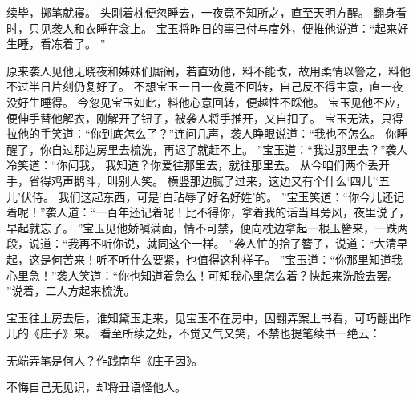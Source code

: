 续毕，掷笔就寝。
头刚着枕便忽睡去，一夜竟不知所之，直至天明方醒。
翻身看时，只见袭人和衣睡在衾上。
宝玉将昨日的事已付与度外，便推他说道：“起来好生睡，看冻着了。
”\par
原来袭人见他无晓夜和姊妹们厮闹，若直劝他，料不能改，故用柔情以警之，料他不过半日片刻仍复好了。
不想宝玉一日一夜竟不回转，自己反不得主意，直一夜没好生睡得。
今忽见宝玉如此，料他心意回转，便越性不睬他。
宝玉见他不应，便伸手替他解衣，刚解开了钮子，被袭人将手推开，又自扣了。
宝玉无法，只得拉他的手笑道：“你到底怎么了？”连问几声，袭人睁眼说道：“我也不怎么。
你睡醒了，你自过那边房里去梳洗，再迟了就赶不上。
”宝玉道：“我过那里去？”袭人冷笑道：“你问我，
我知道？你爱往那里去，就往那里去。
从今咱们两个丢开手，省得鸡声鹅斗，叫别人笑。
横竖那边腻了过来，这边又有个什么‘四儿’‘五儿’伏侍。
我们这起东西，可是‘白玷辱了好名好姓’的。
”宝玉笑道：“你今儿还记着呢！”袭人道：“一百年还记着呢！比不得你，拿着我的话当耳旁风，夜里说了，早起就忘了。
”宝玉见他娇嗔满面，情不可禁，便向枕边拿起一根玉簪来，一跌两段，说道：“我再不听你说，就同这个一样。
”袭人忙的拾了簪子，说道：“大清早起，这是何苦来！听不听什么要紧，也值得这种样子。
”宝玉道：“你那里知道我心里急！”袭人笑道：“你也知道着急么！可知我心里怎么着？快起来洗脸去罢。
”说着，二人方起来梳洗。
\par
宝玉往上房去后，谁知黛玉走来，见宝玉不在房中，因翻弄案上书看，可巧翻出昨儿的《庄子》来。
看至所续之处，不觉又气又笑，不禁也提笔续书一绝云：\par
\hop
无端弄笔是何人？作践南华《庄子因》。
\par
不悔自己无见识，却将丑语怪他人。
\par
